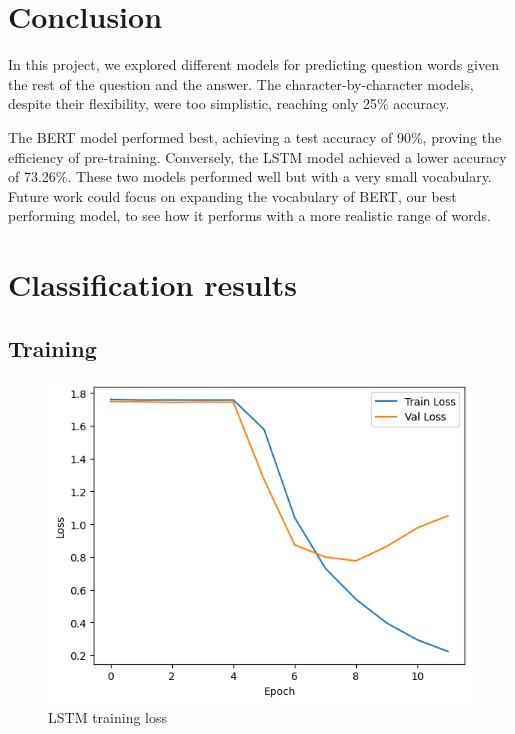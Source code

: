 \documentclass{article}
\begin{document}
\section{Conclusion}
In this project, we explored different models for predicting question words given the rest of the question and the answer. The character-by-character models, despite their flexibility, were too simplistic, reaching only 25\% accuracy.

The BERT model performed best, achieving a test accuracy of 90\%, proving the efficiency of pre-training. Conversely, the LSTM model achieved a lower accuracy of 73.26\%. These two models performed well but with a very small vocabulary. Future work could focus on expanding the vocabulary of BERT, our best performing model, to see how it performs with a more realistic range of words.

\medskip

\newpage

\printbibliography

\newpage

\appendix

\section{Classification results}

\subsection{Training}

\begin{figure}[ht]
    \centering
    \includegraphics[width=0.8\linewidth]{results/classification/lstm loss.png}
    \caption{LSTM training loss}
    \label{fig:lstm-loss}
\end{figure}
\newpage
\end{document}
